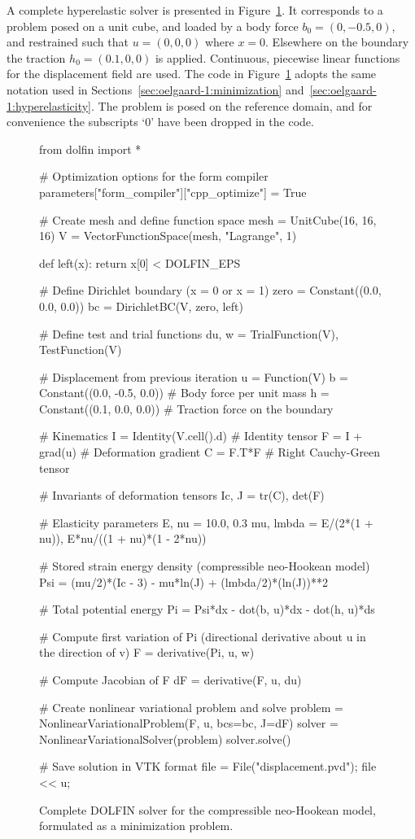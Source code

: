 A complete hyperelastic solver is presented
in Figure~\ref{fig:oelgaard-1:hyperelastic_solver_code}.
It corresponds to a problem posed on a unit cube, and loaded by
a body force $b_{0} = (0, -0.5, 0)$, and restrained such that $u =
(0, 0, 0)$ where $x = 0$. Elsewhere on the boundary the traction
$h_{0} = (0.1, 0, 0)$ is applied.  Continuous, piecewise linear
functions for the displacement field are used. The code in
Figure~\ref{fig:oelgaard-1:hyperelastic_solver_code} adopts the
same notation used in Sections~\ref{sec:oelgaard-1:minimization}
and~\ref{sec:oelgaard-1:hyperelasticity}. The problem is posed on the
reference domain, and for convenience the subscripts `$0$' have been
dropped in the code.

\begin{figure}
\bwfig
\begin{python}
from dolfin import *

# Optimization options for the form compiler
parameters["form_compiler"]["cpp_optimize"] = True

# Create mesh and define function space
mesh = UnitCube(16, 16, 16)
V = VectorFunctionSpace(mesh, "Lagrange", 1)

def left(x):
    return x[0] < DOLFIN_EPS

# Define Dirichlet boundary (x = 0 or x = 1)
zero = Constant((0.0, 0.0, 0.0))
bc = DirichletBC(V, zero, left)

# Define test and trial functions
du, w = TrialFunction(V), TestFunction(V)

# Displacement from previous iteration
u  = Function(V)
b  = Constant((0.0, -0.5, 0.0))  # Body force per unit mass
h  = Constant((0.1,  0.0, 0.0))  # Traction force on the boundary

# Kinematics
I = Identity(V.cell().d)    # Identity tensor
F = I + grad(u)             # Deformation gradient
C = F.T*F                   # Right Cauchy-Green tensor

# Invariants of deformation tensors
Ic, J = tr(C), det(F)

# Elasticity parameters
E, nu = 10.0, 0.3
mu, lmbda = E/(2*(1 + nu)), E*nu/((1 + nu)*(1 - 2*nu))

# Stored strain energy density (compressible neo-Hookean model)
Psi = (mu/2)*(Ic - 3) - mu*ln(J) + (lmbda/2)*(ln(J))**2

# Total potential energy
Pi = Psi*dx - dot(b, u)*dx - dot(h, u)*ds

# Compute first variation of Pi (directional derivative about u in the direction of v)
F = derivative(Pi, u, w)

# Compute Jacobian of F
dF = derivative(F, u, du)

# Create nonlinear variational problem and solve
problem = NonlinearVariationalProblem(F, u, bcs=bc, J=dF)
solver = NonlinearVariationalSolver(problem)
solver.solve()

# Save solution in VTK format
file = File("displacement.pvd");
file << u;
\end{python}
\caption{Complete DOLFIN solver for the compressible neo-Hookean model,
formulated as a minimization problem.}
\label{fig:oelgaard-1:hyperelastic_solver_code}
\end{figure}

